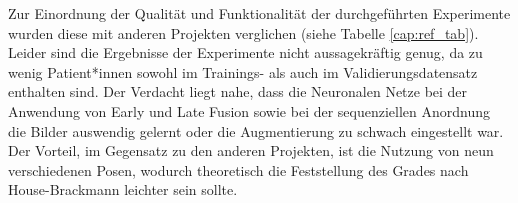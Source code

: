 \clearpage

Zur Einordnung der Qualität und Funktionalität der durchgeführten Experimente wurden diese mit anderen Projekten verglichen (siehe Tabelle \ref{cap:ref_tab}). Leider sind die Ergebnisse der Experimente nicht aussagekräftig genug, da zu wenig Patient*innen sowohl im Trainings- als auch im Validierungsdatensatz enthalten sind. Der Verdacht liegt nahe, dass die Neuronalen Netze bei der Anwendung von Early und Late Fusion sowie bei der sequenziellen Anordnung die Bilder auswendig gelernt oder die Augmentierung zu schwach eingestellt war. Der Vorteil, im Gegensatz zu den anderen Projekten, ist die Nutzung von neun verschiedenen Posen, wodurch theoretisch die Feststellung des Grades nach House-Brackmann leichter sein sollte.
